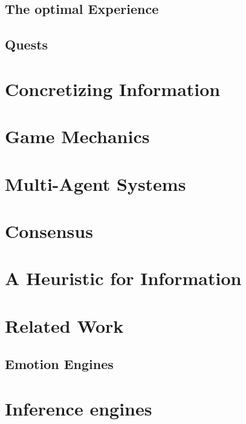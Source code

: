 \subsection{The optimal Experience}
\subsection{Quests}
\section{Concretizing Information}
\section{Game Mechanics}
\section{Multi-Agent Systems}
\section{Consensus}
\section{A Heuristic for Information}
\section{Related Work}
\subsection{Emotion Engines}
\section{Inference engines}

